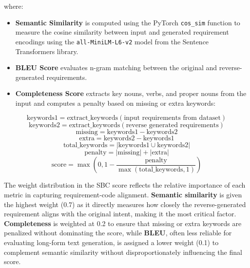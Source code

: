 \documentclass{article}
\begin{document}
where:

\begin{itemize}
    \item \textbf{Semantic Similarity} is computed using the PyTorch \texttt{cos\_sim} function to measure the cosine similarity between input and generated requirement encodings using the \texttt{all-MiniLM-L6-v2} model from the Sentence Transformers library.
    \item \textbf{BLEU Score} evaluates n-gram matching between the original and reverse-generated requirements.
    \item \textbf{Completeness Score} extracts key nouns, verbs, and proper nouns from the input and computes a penalty based on missing or extra keywords:
\end{itemize}

\begin{equation}
\text{keywords1} = \text{extract\_keywords}(\text{input requirements from dataset})
\end{equation}
\begin{equation}
\text{keywords2} = \text{extract\_keywords}(\text{reverse generated requirements})
\end{equation}
\begin{equation}
\text{missing} = \text{keywords1} - \text{keywords2}
\end{equation}
\begin{equation}
\text{extra} = \text{keywords2} - \text{keywords1}
\end{equation}
\begin{equation}
\text{total\_keywords} = \left|\text{keywords1} \cup \text{keywords2}\right|
\end{equation}
\begin{equation}
\text{penalty} = \left|\text{missing}\right| + \left|\text{extra}\right|
\end{equation}
\begin{equation}
\text{score} = \max\left( 0, 1 - \frac{\text{penalty}}{\max\left(\text{total\_keywords}, 1\right)} \right)
\end{equation}

\vspace{\baselineskip}
The weight distribution in the SBC score reflects the relative importance of each metric in capturing requirement-code alignment. 
\textbf{Semantic similarity} is given the highest weight (0.7) as it directly measures how closely the reverse-generated requirement aligns with the original intent, making it the most critical factor. 
\textbf{Completeness} is weighted at 0.2 to ensure that missing or extra keywords are penalized without dominating the score, while \textbf{BLEU}, often less reliable for evaluating long-form text generation, is assigned a lower weight (0.1) to complement semantic similarity without disproportionately influencing the final score.
\end{document}
